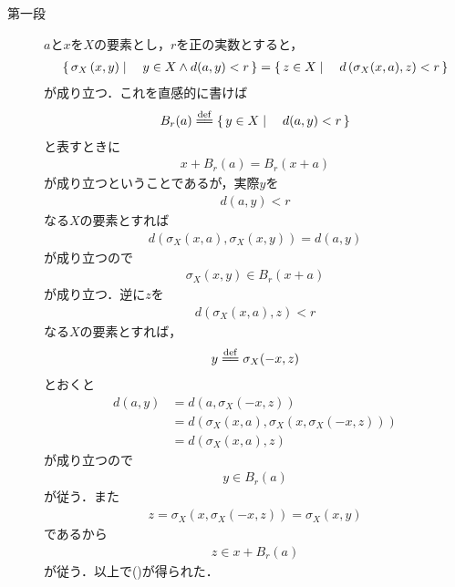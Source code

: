 	\begin{sketch}\mbox{}
		\begin{description}
			\item[第一段]
				$a$と$x$を$X$の要素とし，$r$を正の実数とすると，
				\begin{align}
					\left\{\, \sigma_X\left(x,y\right) \mid \quad y \in X \wedge d(a,y) < r\, \right\} 
					= \left\{\, z \in X \mid \quad d\left(\sigma_X(x,a),z\right) < r\, \right\}
					\label{fom:thm_topology_induced_by_left_invariant_metric_is_invariant_1}
				\end{align}
				が成り立つ．これを直感的に書けば
				\begin{align}
					B_r(a) \defeq \Set{y \in X}{d(a,y) < r}
				\end{align}
				と表すときに
				\begin{align}
					x + B_r(a) = B_r(x+a)
				\end{align}
				が成り立つということであるが，実際$y$を
				\begin{align}
					d(a,y) < r
				\end{align}
				なる$X$の要素とすれば
				\begin{align}
					d\left(\sigma_X(x,a),\sigma_X\left(x,y\right)\right)
					= d\left(a,y\right)
				\end{align}
				が成り立つので
				\begin{align}
					\sigma_X\left(x,y\right) \in B_r(x+a)
				\end{align}
				が成り立つ．逆に$z$を
				\begin{align}
					d\left(\sigma_X(x,a),z\right) < r
				\end{align}
				なる$X$の要素とすれば，
				\begin{align}
					y \defeq \sigma_X(-x,z)
				\end{align}
				とおくと
				\begin{align}
					d\left(a,y\right) &= d\left(a,\sigma_X(-x,z)\right) \\
					&= d\left(\sigma_X\left(x,a\right),\sigma_X\left(x,\sigma_X(-x,z)\right)\right) \\
					&= d\left(\sigma_X\left(x,a\right),z\right)
				\end{align}
				が成り立つので
				\begin{align}
					y \in B_r(a)
				\end{align}
				が従う．また
				\begin{align}
					z = \sigma_X\left(x,\sigma_X(-x,z)\right) = \sigma_X\left(x,y\right)
				\end{align}
				であるから
				\begin{align}
					z \in x + B_r(a)
				\end{align}
				が従う．以上で()が得られた．
				

\end{description}
\end{sketch}
